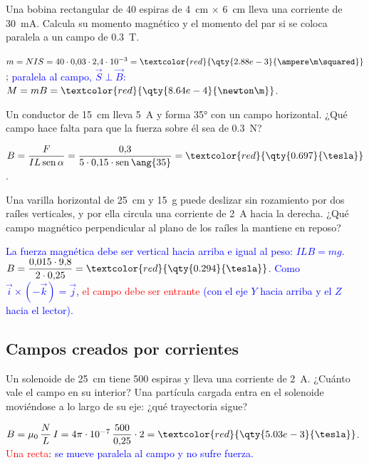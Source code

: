 \begin{exercise}
    Una bobina rectangular de 40 espiras de \qty{4}{\cm} \(\times\) \qty{6}{\cm} lleva una corriente de \qty{30}{\milli\ampere}. Calcula su
    momento magnético y el momento del par si se coloca paralela a un campo de \qty{0.3}{\tesla}.
    \begin{solu}
        \(m = NIS = 40\cdot 0{,}03\cdot 2{,}4\cdot 10^{-3} = \textcolor{red}{\qty{2.88e-3}{\ampere\m\squared}}\);
        \textcolor{blue}{paralela al campo, \(\vec S\perp\vec B\):} \(M = mB = \textcolor{red}{\qty{8.64e-4}{\newton\m}}\).
    \end{solu}
\end{exercise}

\begin{exercise}
    Un conductor de \qty{15}{\cm} lleva \qty{5}{\ampere} y forma \ang{35} con un campo horizontal. ¿Qué campo hace falta para que la fuerza
    sobre él sea de \qty{0.3}{\newton}?
    \begin{solu}
        \(B = \dfrac{F}{IL\sen\alpha} = \dfrac{0{,}3}{5\cdot 0{,}15\cdot\sen\ang{35}} = \textcolor{red}{\qty{0.697}{\tesla}}\).
    \end{solu}
\end{exercise}

\begin{exercise}
    Una varilla horizontal de \qty{25}{\cm} y \qty{15}{\g} puede deslizar sin rozamiento por dos raíles verticales, y por ella circula una
    corriente de \qty{2}{\ampere} hacia la derecha. ¿Qué campo magnético perpendicular al plano de los raíles la mantiene en reposo?
    \begin{solu}
        \textcolor{blue}{La fuerza magnética debe ser vertical hacia arriba e igual al peso: \(ILB = mg\).}
        \(B = \dfrac{0{,}015\cdot 9{,}8}{2\cdot 0{,}25} = \textcolor{red}{\qty{0.294}{\tesla}}\).
        \textcolor{blue}{Como \(\vec{i}\times(-\vec{k}) = \vec{j}\),} \textcolor{red}{el campo debe ser entrante} \textcolor{blue}{(con el eje \(Y\) hacia arriba y el \(Z\) hacia el lector).}
    \end{solu}
\end{exercise}

\subsection{Campos creados por corrientes}

\begin{exercise}
    Un solenoide de \qty{25}{\cm} tiene 500 espiras y lleva una corriente de \qty{2}{\ampere}. ¿Cuánto vale el campo en su interior? Una
    partícula cargada entra en el solenoide moviéndose a lo largo de su eje: ¿qué trayectoria sigue?
    \begin{solu}
        \(B = \mu_0\,\dfrac{N}{L}\,I = 4\pi\cdot 10^{-7}\,\dfrac{500}{0{,}25}\cdot 2 = \textcolor{red}{\qty{5.03e-3}{\tesla}}\).
        \textcolor{red}{Una recta}: \textcolor{blue}{se mueve paralela al campo y no sufre fuerza.}
    \end{solu}
\end{exercise}


